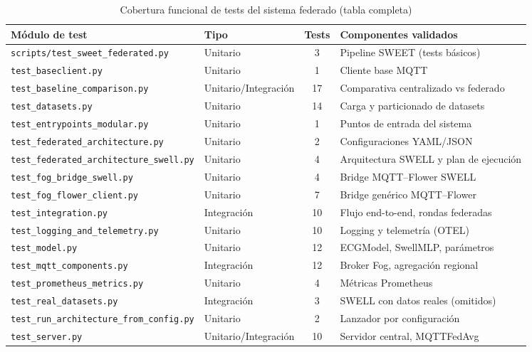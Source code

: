 \documentclass{report}
\begin{document}
\begin{table}[H]
\centering
\footnotesize
\caption{Cobertura funcional de tests del sistema federado (tabla completa)}
\label{tab:test_coverage_full}
\renewcommand{\arraystretch}{1.2}
\begin{tabular}{llcl}
\hline
\textbf{Módulo de test} & \textbf{Tipo} & \textbf{Tests} & \textbf{Componentes validados} \\
\hline
\texttt{scripts/test\_sweet\_federated.py} & Unitario & 3 & Pipeline SWEET (tests básicos) \\
\texttt{test\_baseclient.py} & Unitario & 1 & Cliente base MQTT \\
\texttt{test\_baseline\_comparison.py} & Unitario/Integración & 17 & Comparativa centralizado vs federado \\
\texttt{test\_datasets.py} & Unitario & 14 & Carga y particionado de datasets \\
\texttt{test\_entrypoints\_modular.py} & Unitario & 1 & Puntos de entrada del sistema \\
\texttt{test\_federated\_architecture.py} & Unitario & 2 & Configuraciones YAML/JSON \\
\texttt{test\_federated\_architecture\_swell.py} & Unitario & 4 & Arquitectura SWELL y plan de ejecución \\
\texttt{test\_fog\_bridge\_swell.py} & Unitario & 4 & Bridge MQTT--Flower SWELL \\
\texttt{test\_fog\_flower\_client.py} & Unitario & 7 & Bridge genérico MQTT--Flower \\
\texttt{test\_integration.py} & Integración & 10 & Flujo end-to-end, rondas federadas \\
\texttt{test\_logging\_and\_telemetry.py} & Unitario & 10 & Logging y telemetría (OTEL) \\
\texttt{test\_model.py} & Unitario & 12 & ECGModel, SwellMLP, parámetros \\
\texttt{test\_mqtt\_components.py} & Integración & 12 & Broker Fog, agregación regional \\
\texttt{test\_prometheus\_metrics.py} & Unitario & 4 & Métricas Prometheus \\
\texttt{test\_real\_datasets.py} & Integración & 3 & SWELL con datos reales (omitidos) \\
\texttt{test\_run\_architecture\_from\_config.py} & Unitario & 2 & Lanzador por configuración \\
\texttt{test\_server.py} & Unitario/Integración & 10 & Servidor central, MQTTFedAvg \\

\end{tabular}
\end{table}
\end{document}
